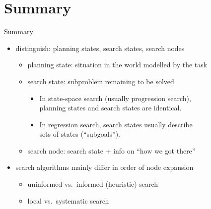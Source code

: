 \documentclass{gkibeamer}
\begin{document}
\section*{Summary}

\begin{frame}{Summary}
  \begin{itemize}
  \item distinguish: \alert{planning states}, \alert{search states},
    \alert{search nodes}
    \begin{itemize}
    \item \alert{planning state}: situation in the world
      modelled by the task
    \item \alert{search state}: subproblem remaining to be solved
      \begin{itemize}
      \item In \alert{state-space search} (usually progression
        search), \\ planning states and search states are identical.
      \item In regression search, search states usually describe
        \\ sets of states (``subgoals'').
      \end{itemize}
    \item \alert{search node:} search state + info on ``how we got
      there''
    \end{itemize}
  \item search algorithms mainly differ in \alert{order of node expansion}
    \begin{itemize}
    \item \alert{uninformed} vs.\ \alert{informed} (\alert{heuristic})
      search
    \item \alert{local} vs.\ \alert{systematic} search
    \end{itemize}
  \end{itemize}
\end{frame}
\end{document}

